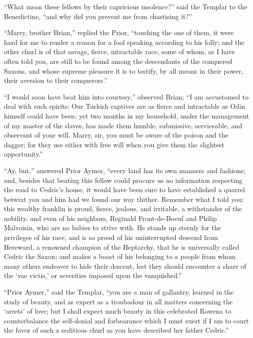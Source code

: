 ``What mean these fellows by their capricious insolence?'' said the
Templar to the Benedictine, ``and why did you prevent me from chastising
it?''

``Marry, brother Brian,'' replied the Prior, ``touching the one of them,
it were hard for me to render a reason for a fool speaking according to
his folly; and the other churl is of that savage, fierce, intractable
race, some of whom, as I have often told you, are still to be found
among the descendants of the conquered Saxons, and whose supreme
pleasure it is to testify, by all means in their power, their aversion
to their conquerors.''

``I would soon have beat him into courtesy,'' observed Brian; ``I am
accustomed to deal with such spirits: Our Turkish captives are as fierce
and intractable as Odin himself could have been; yet two months in my
household, under the management of my master of the slaves, has made
them humble, submissive, serviceable, and observant of your will. Marry,
sir, you must be aware of the poison and the dagger; for they use either
with free will when you give them the slightest opportunity.''

``Ay, but,'' answered Prior Aymer, ``every land has its own manners and
fashions; and, besides that beating this fellow could procure us no
information respecting the road to Cedric's house, it would have been
sure to have established a quarrel betwixt you and him had we found our
way thither. Remember what I told you: this wealthy franklin is proud,
fierce, jealous, and irritable, a withstander of the nobility, and even
of his neighbors, Reginald Front-de-Boeuf and Philip Malvoisin, who are
no babies to strive with. He stands up sternly for the privileges of his
race, and is so proud of his uninterrupted descend from Hereward, a
renowned champion of the Heptarchy, that he is universally called Cedric
the Saxon; and makes a boast of his belonging to a people from whom many
others endeaver to hide their descent, lest they should encounter a
share of the `vae victis,' or severities imposed upon the vanquished.''

``Prior Aymer,'' said the Templar, ``you are a man of gallantry, learned
in the study of beauty, and as expert as a troubadour in all matters
concerning the `arrets' of love; but I shall expect much beauty in this
celebrated Rowena to counterbalance the self-denial and forbearance
which I must exert if I am to court the favor of such a seditious churl
as you have described her father Cedric.''

